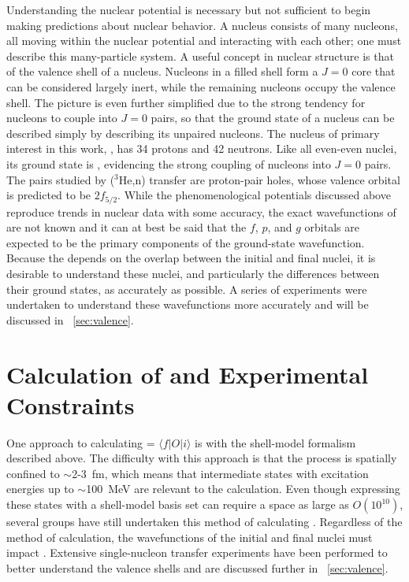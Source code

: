 Understanding the nuclear potential is necessary but not sufficient to begin making predictions about nuclear behavior.  A nucleus consists of many nucleons, all moving within the nuclear potential and interacting with each other; one must describe this many-particle system.  A useful concept in nuclear structure is that of the valence shell of a nucleus.  Nucleons in a filled shell form a $J=0$ core that can be considered largely inert, while the remaining nucleons occupy the valence shell.  The picture is even further simplified due to the strong tendency for nucleons to couple into $J=0$ pairs, so that the ground state of a nucleus can be described simply by describing its unpaired nucleons.  The nucleus of primary interest in this work, , has 34 protons and 42 neutrons.  Like all even-even nuclei, its ground state is \zp, evidencing the strong coupling of nucleons into $J=0$ pairs.  The pairs studied by ($^3$He,n) transfer are proton-pair holes, whose valence orbital is predicted to be $2f_{5/2}$.  While the phenomenological potentials discussed above reproduce trends in nuclear data with some accuracy, the exact wavefunctions of \SeProducts are not known and it can at best be said that the $f$, $p$, and $g$ orbitals are expected to be the primary components of the ground-state wavefunction.  Because the \NME depends on the overlap between the initial and final nuclei, it is desirable to understand these nuclei, and particularly the differences between their ground states, as accurately as possible.  A series of experiments were undertaken to understand these wavefunctions more accurately and will be discussed in {\sect}~\ref{sec:valence}.
\FloatBarrier

\section{Calculation of \NME and Experimental Constraints}

One approach to calculating \NME = $\langle f|O|i \rangle$ is with the shell-model formalism described above.  The difficulty with this approach is that the \zvbb process is spatially confined to $\sim$2-3~fm, which means that intermediate states with excitation energies up to $\sim$100~MeV \citep{anatomy} are relevant to the calculation.  Even though expressing these states with a shell-model basis set can require a space as large as $O(10^{10})$,  several groups have still undertaken this method of calculating \NME \citep{CaurierShellModel}.  Regardless of the method of calculation, the wavefunctions of the initial and final nuclei must impact \NME.  Extensive single-nucleon transfer experiments have been performed to better understand the valence shells and are discussed further in {\sect}~\ref{sec:valence}.

